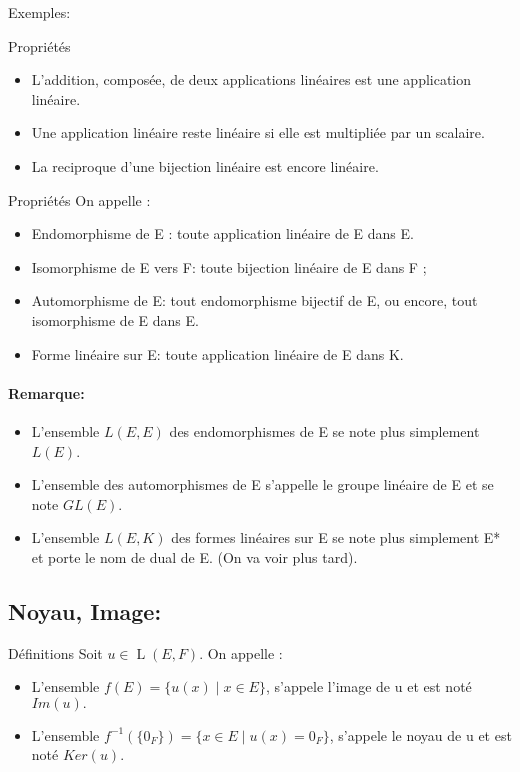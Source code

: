 \documentclass{book}
\begin{document}
Exemples: 
\begin{Propriété}[]{Propriétés}{}
\begin{itemize}
    \item L'addition, composée, de deux applications linéaires est une application linéaire.
    \item Une application linéaire reste linéaire si elle est multipliée par un scalaire.
    \item La reciproque d'une bijection linéaire est encore linéaire.
\end{itemize}
\end{Propriété}
\begin{Propriété}[]{Propriétés}{}
On appelle :
\begin{itemize}
    \item Endomorphisme de E : toute application linéaire de E dans E.
    \item Isomorphisme de E vers F:  toute bijection linéaire de E dans F ;
    \item Automorphisme de E: tout endomorphisme bijectif de E, ou encore, tout isomorphisme de E dans E.
    \item Forme linéaire sur E:  toute application linéaire de E dans K.
\end{itemize}
\end{Propriété}
\paragraph{Remarque: }
\begin{itemize}
    \item L'ensemble \(L(E, E)\) des endomorphismes de E se note plus simplement \(L(E)\).
    \item L'ensemble des automorphismes de E s’appelle le groupe linéaire de E et se note \(GL(E)\).
    \item L'ensemble \(L(E, K)\) des formes linéaires sur E se note plus simplement E* et porte le nom de dual de E. (On va voir plus tard).
\end{itemize}

\subsection{Noyau, Image: }
\begin{Définition}[]{Définitions}{}
Soit ${\displaystyle u\in \operatorname {L} (E,F)}$. On appelle :
\begin{itemize}
    \item L'ensemble $f(E)= {\displaystyle \{u(x)\mid x\in E\}}$, s'appele l'image de u et est noté ${\displaystyle Im(u).}$
    \item L'ensemble $f^{-1}(\{0_{F}\}) = {\displaystyle \{x\in E\mid u(x)=0_{F}\}}$, s'appele le noyau de u et est noté ${\displaystyle Ker(u)}$.
\end{itemize}
\end{Définition}
\end{document}
